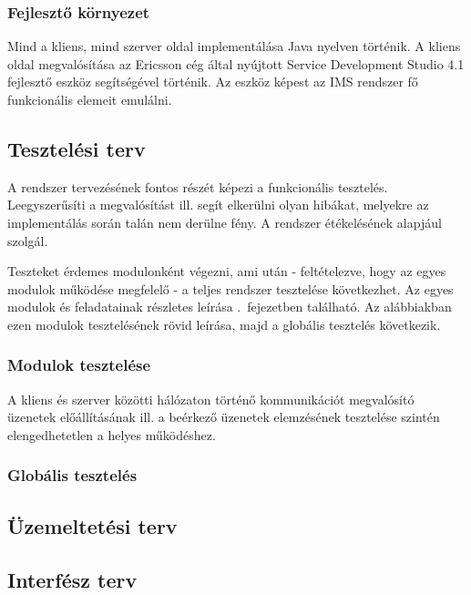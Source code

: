 \subsubsection{Fejlesztő környezet}

Mind a kliens, mind szerver oldal implementálása Java nyelven történik. A kliens oldal megvalósítása az Ericsson cég által nyújtott Service Development Studio 4.1 fej\-lesz\-tő eszköz segítségével történik. Az eszköz képest az IMS rendszer fő funkcionális elemeit emulálni.


\subsection{Tesztelési terv}
\label{sec:tesztelesi_terv}

A rendszer tervezésének fontos részét képezi a funkcionális tesztelés. Leegyszerűsíti a megvalósítást ill. segít elkerülni olyan hibákat, melyekre az imp\-le\-men\-tá\-lás során talán nem derülne fény. A rendszer étékelésének alapjául szolgál.

Teszteket érdemes modulonként végezni, ami után - feltételezve, hogy az egyes mo\-du\-lok működése megfelelő - a teljes rendszer tesztelése következhet. %
Az egyes modulok és feladatainak részletes leírása .~fejezetben található. Az alábbiakban ezen modulok tesztelésének rövid leírása, majd a globális tesztelés következik.

\subsubsection{Modulok tesztelése}

A kliens és szerver közötti hálózaton történő kommunikációt megvalósító üzenetek előállításának ill. a beérkező üzenetek elemzésének tesztelése szintén elengedhetetlen a helyes működéshez.

\subsubsection{Globális tesztelés}

\subsection{Üzemeltetési terv}
\label{sec:uzemeltetesi_terv}

\subsection{Interfész terv}
\label{sec:interfesz_terv}

